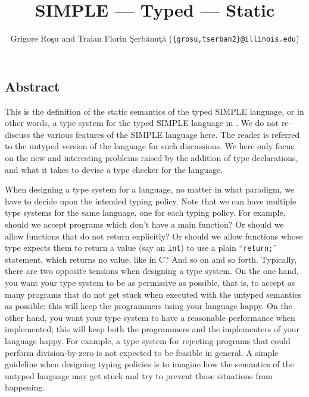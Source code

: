 \setlength{\parindent}{1em}
\title{SIMPLE --- Typed --- Static}
\author{Grigore Ro\c{s}u and 
        Traian Florin \c{S}erb\u{a}nu\c{t}\u{a}
        (\texttt{\{grosu,tserban2\}@illinois.edu})}

\maketitle

\begin{latexComment}
\section{Abstract}
This is the \K definition of the static semantics of the typed SIMPLE
language, or in other words, a type system for the typed SIMPLE
language in \K.  We do not re-discuss the various features of the
SIMPLE language here.  The reader is referred to the untyped version of
the language for such discussions.  We here only focus on the new and
interesting problems raised by the addition of type declarations, and
what it takes to devise a type checker for the language.

When designing a type system for a language, no matter in what
paradigm, we have to decide upon the intended typing policy.  Note
that we can have multiple type systems for the same language, one for
each typing policy.  For example, should we accept programs which
don't have a main function?  Or should we allow functions that do not
return explicitly?  Or should we allow functions whose type expects
them to return a value (say an \texttt{int}) to use a plain
``\texttt{return;}'' statement, which returns no value, like in C?
And so on and so forth.  Typically, there are two opposite tensions
when designing a type system.  On the one hand, you want your type
system to be as permissive as possible, that is, to accept as many
programs that do not get stuck when executed with the untyped
semantics as possible; this will keep the programmers using your
language happy.  On the other hand, you want your type system to have
a reasonable performance when implemented; this will keep both the
programmers and the implementers of your language happy.  For example,
a type system for rejecting programs that could perform
division-by-zero is not expected to be feasible in general.  A simple
guideline when designing typing policies is to imagine how the
semantics of the untyped language may get stuck and try to prevent
those situations from happening.


\end{latexComment}
